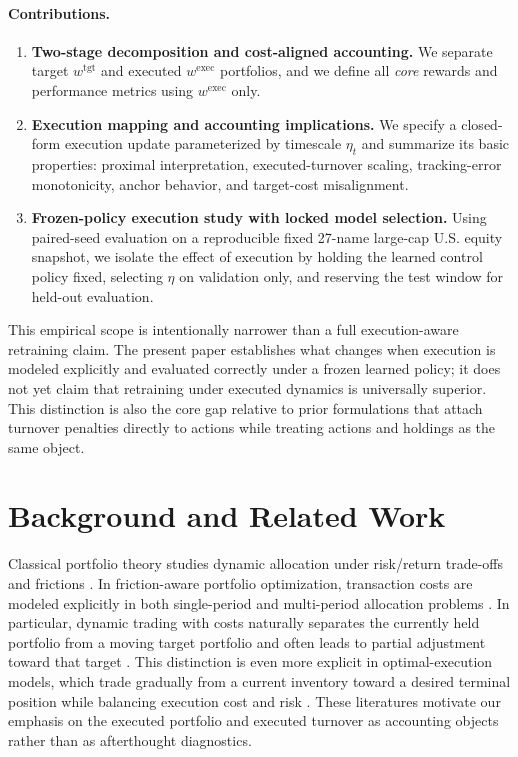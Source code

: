 \documentclass[10pt,twocolumn]{article}
\newcommand{\wexec}{w^{\mathrm{exec}}}
\newcommand{\wtgt}{w^{\mathrm{tgt}}}
\begin{document}
\paragraph{Contributions.}
\begin{enumerate}[leftmargin=*,itemsep=2pt]
\item \textbf{Two-stage decomposition and cost-aligned accounting.} We separate target $\wtgt$ and executed $\wexec$ portfolios, and we define all \emph{core} rewards and performance metrics using $\wexec$ only.
\item \textbf{Execution mapping and accounting implications.} We specify a closed-form execution update parameterized by timescale $\eta_t$ and summarize its basic properties: proximal interpretation, executed-turnover scaling, tracking-error monotonicity, anchor behavior, and target-cost misalignment.
\item \textbf{Frozen-policy execution study with locked model selection.} Using paired-seed evaluation on a reproducible fixed 27-name large-cap U.S. equity snapshot, we isolate the effect of execution by holding the learned control policy fixed, selecting $\eta$ on validation only, and reserving the test window for held-out evaluation.
\end{enumerate}
This empirical scope is intentionally narrower than a full execution-aware retraining claim. The present paper establishes what changes when execution is modeled explicitly and evaluated correctly under a frozen learned policy; it does not yet claim that retraining under executed dynamics is universally superior. This distinction is also the core gap relative to prior formulations that attach turnover penalties directly to actions while treating actions and holdings as the same object.

\section{Background and Related Work}
Classical portfolio theory studies dynamic allocation under risk/return trade-offs and frictions \cite{markowitz1952,merton1973}. In friction-aware portfolio optimization, transaction costs are modeled explicitly in both single-period and multi-period allocation problems \cite{lobo2007,garleanu2013}. In particular, dynamic trading with costs naturally separates the currently held portfolio from a moving target portfolio and often leads to partial adjustment toward that target \cite{garleanu2013}. This distinction is even more explicit in optimal-execution models, which trade gradually from a current inventory toward a desired terminal position while balancing execution cost and risk \cite{bertsimas1998,almgren2000}. These literatures motivate our emphasis on the executed portfolio and executed turnover as accounting objects rather than as afterthought diagnostics.
\end{document}
